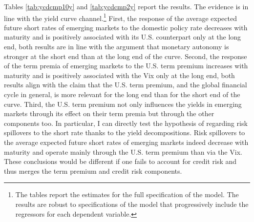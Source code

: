{Tables \ref{tab:ycdcmp10y} and \ref{tab:ycdcmp2y} report the results.
The evidence is in line with the yield curve channel.\footnote{ The tables report the estimates for the full specification of the model. The results are robust to specifications of the model that progressively include the regressors for each dependent variable.} 
First, the response of the average expected future short rates of emerging markets to the domestic policy rate decreases with maturity and is positively associated with its U.S. counterpart only at the long end, both results are in line with the argument that monetary autonomy is stronger at the short end than at the long end of the curve.
Second, the response of the term premia of emerging markets to the U.S. term premium increases with maturity and is positively associated with the Vix only at the long end, both results align with the claim that the U.S. term premium, and the global financial cycle in general, is more relevant for the long end than for the short end of the curve. 
Third, the U.S. term premium not only influences the yields in emerging markets through its effect on their term premia but through the other components too.
In particular, I can directly test the hypothesis of \cite{Kalemli-Ozcan:2019} regarding risk spillovers to the short rate thanks to the yield decompositions.
Risk spillovers to the average expected future short rates of emerging markets indeed decrease with maturity and operate mainly through 
the U.S. term premium than via the Vix.
These conclusions would be different if one fails to account for credit risk and thus merges the term premium and credit risk components.



}
